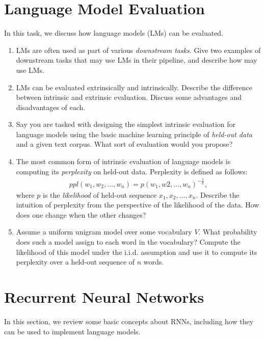 \documentclass[11pt,a4paper]{article}
\begin{document}
\newpage
\section{Language Model Evaluation}

In this task, we discuss how language models (LMs) can be evaluated.

\begin{enumerate}[label=(\alph*)]
    \item LMs are often used as part of various \emph{downstream tasks}.
          Give two examples of downstream tasks that may use LMs in their
          pipeline, and describe how may use LMs.
    \item LMs can be evaluated extrinsically and intrinsically.
          Describe the difference between intrinsic and extrinsic evaluation.
          Discuss some advantages and disadvantages of each.
    \item Say you are tasked with designing the simplest
          intrinsic evaluation for language models using the basic machine
          learning principle of \emph{held-out data} and a given text
          corpus.
          What sort of evaluation would you propose?
    \item The most common form of intrinsic evaluation of language models is
          computing its \emph{perplexity} on held-out data.
          Perplexity is defined as follows:
          \begin{align*}
              ppl(w_1,w_2,\ldots,w_n) = p(w_1,w2,\ldots,w_n)^{-\frac{1}{n}},
          \end{align*}
          where $p$ is the \emph{likelihood} of held-out sequence
          $x_1, x_2, \ldots, x_n$.
          Describe the intuition of perplexity from the perspective of the
          likelihood of the data. How does one change when the other changes?
    \item Assume a uniform unigram model over some vocabulary $V$. What
          probability does such a model assign to each word in the vocabulary?
          Compute the likelihood of this model under the i.i.d. assumption and 
          use it to compute its perplexity over a held-out sequence of $n$ words.
\end{enumerate}

\section{Recurrent Neural Networks}

In this section, we review some basic concepts about RNNs, including how they
can be used to implement language models.
\end{document}
